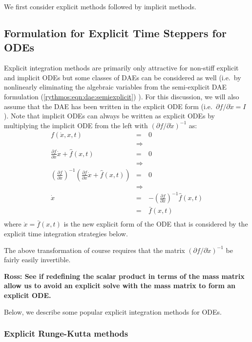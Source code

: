 \documentclass[pdf,ps2pdf,11pt]{SANDreport}
\begin{document}
We first consider explicit methods followed by implicit methods.

\subsection{Formulation for Explicit Time Steppers for ODEs}

Explicit integration methods are primarily only attractive for non-stiff explicit and
implicit ODEs but some classes of DAEs can be considered as well (i.e.\ by
nonlinearly eliminating the algebraic variables from the semi-explicit DAE formulation 
(\ref{rythmos:eqn:dae:semiexplicit}) \cite{BCP}).  For this discussion, we will also assume
that the DAE has been written in the explicit ODE form (i.e.\ ${}\partial f /
{}\partial {}\dot{x} = I$).  Note that implicit ODEs can always be written as
explicit ODEs by multiplying the implicit ODE from the left with $({}\partial
f / {}\partial {}\dot{x})^{-1}$ as:
%
\begin{eqnarray*}
f(\dot{x},x,t) & = & 0 \\
& \Rightarrow \\
\frac{\partial f}{\partial \dot{x}} \dot{x} + \hat{f}(x,t) & = & 0 \\
& \Rightarrow \\
\left( \frac{\partial f}{\partial \dot{x}} \right)^{-1}
\left( \frac{\partial f}{\partial \dot{x}} \dot{x} + \hat{f}(x,t) \right) & = & 0 \\
& \Rightarrow \\
\dot{x} & = & -\left( \frac{\partial f}{\partial \dot{x}} \right)^{-1} \hat{f}(x,t) \\
& = & \bar{f}(x,t) \\
\end{eqnarray*}
%
where ${}\dot{x} = \bar{f}(x,t)$ is the new explicit form of the ODE that is
considered by the explicit time integration strategies below.

The above transformation of course requires that the matrix $({}\partial f /
{}\partial {}\dot{x})^{-1}$ be fairly easily invertible.

{}\textbf{Ross: See if redefining the scalar product in terms of the mass
matrix allow us to avoid an explicit solve with the mass matrix to form an
explicit ODE.}

Below, we describe some popular explicit integration methods for ODEs.

\subsubsection{Explicit Runge-Kutta methods}
\end{document}
